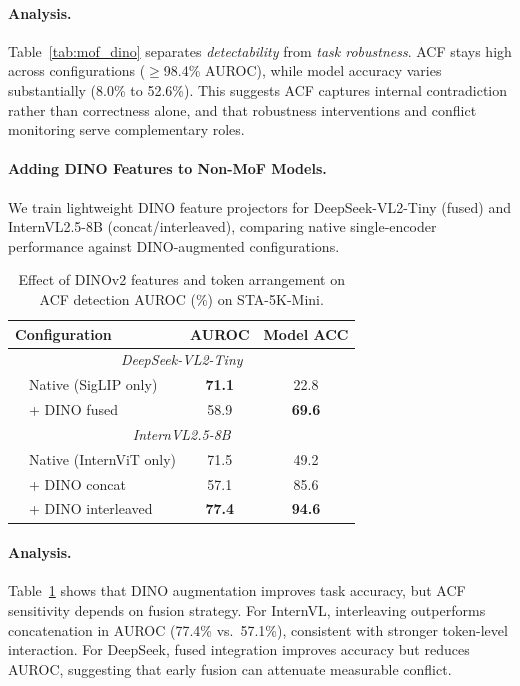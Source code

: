 \documentclass[preprint,12pt]{elsarticle}
\begin{document}
\paragraph{Analysis.} Table~\ref{tab:mof_dino} separates \textit{detectability} from \textit{task robustness}. ACF stays high across configurations ($\geq$98.4\% AUROC), while model accuracy varies substantially (8.0\% to 52.6\%). This suggests ACF captures internal contradiction rather than correctness alone, and that robustness interventions and conflict monitoring serve complementary roles.

\paragraph{Adding DINO Features to Non-MoF Models.}
We train lightweight DINO feature projectors for DeepSeek-VL2-Tiny (fused) and InternVL2.5-8B (concat/interleaved), comparing native single-encoder performance against DINO-augmented configurations.

\begin{table}[t]
\centering
\caption{Effect of DINOv2 features and token arrangement on ACF detection AUROC (\%) on STA-5K-Mini.}
\label{tab:mof_interleave}
\setlength{\tabcolsep}{4pt}
\begin{tabular}{@{}l c c@{}}
\toprule
Configuration & AUROC & Model ACC \\
\midrule
\multicolumn{3}{c}{\textit{DeepSeek-VL2-Tiny}} \\
~~Native (SigLIP only)   & \textbf{71.1} & 22.8 \\
~~+ DINO fused           & 58.9 & \textbf{69.6} \\
\midrule
\multicolumn{3}{c}{\textit{InternVL2.5-8B}} \\
~~Native (InternViT only)& 71.5 & 49.2 \\
~~+ DINO concat          & 57.1 & 85.6 \\
~~+ DINO interleaved     & \textbf{77.4} & \textbf{94.6} \\
\bottomrule
\end{tabular}
\end{table}

\paragraph{Analysis.} Table~\ref{tab:mof_interleave} shows that DINO augmentation improves task accuracy, but ACF sensitivity depends on fusion strategy. For InternVL, interleaving outperforms concatenation in AUROC (77.4\% vs.\ 57.1\%), consistent with stronger token-level interaction. For DeepSeek, fused integration improves accuracy but reduces AUROC, suggesting that early fusion can attenuate measurable conflict.
\end{document}
